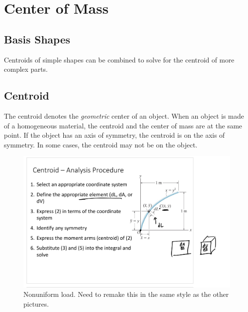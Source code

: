 \section{Center of Mass}



\subsection{Basis Shapes}


Centroids of simple shapes can be combined to solve for the centroid of more complex parts. 

\subsection{Centroid}

The centroid denotes the \textit{geometric} center of an object. When an object is made of a homogeneous material, the centroid and the center of mass are at the same point. If the object has an axis of symmetry, the centroid is on the axis of symmetry. In some cases, the centroid may not be on the object. 


\begin{figure}[!h]
\centering
\includegraphics[angle=0, width=5 in]{COMFigures/CentroidAnalysis.png}
\vspace{-2mm}
\caption{\small Nonuniform load. Need to remake this in the same style as the other pictures.}
\vspace{-3mm}
\label{Fig:CentroidAnalysis}
\end{figure}

